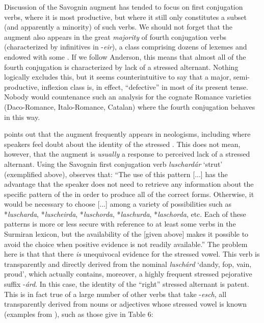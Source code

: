 \documentclass[output=paper,
modfonts
]{LSP/langsci}
\begin{document}
Discussion of the Savognin augment has tended to focus on first
conjugation verbs, where it is most productive, but where it still only
constitutes a subset (and apparently a minority) of such verbs. We
should not forget that the augment also appears in the great
\emph{majority} of fourth conjugation verbs (characterized by
infinitives in -\emph{eir}), a class comprising dozens of lexemes and
endowed with some . If we follow Anderson, this means that
almost all of the fourth conjugation is characterized by lack of a
stressed alternant. Nothing logically excludes this, but it seems
counterintuitive to say that a major, semi-productive, inflexion class
is, in effect, ``defective'' in most of its present tense. Nobody would
countenance such an analysis for the cognate Romance varieties
(Daco-Romance, Italo-Romance, Catalan) where the fourth conjugation
behaves in this way.

\citet[22]{anderson2011a} points out that the augment frequently appears in
neologisms, including where speakers feel doubt about the identity of
the stressed . This does not mean, however, that the augment is
\emph{usually} a response to perceived lack of a stressed alternant.
Using the Savognin first conjugation verb \emph{luschardár} `strut'
(exemplified above), \citet[122]{anderson2008a} observes that: ``The use of this
pattern {[}...{]} has the advantage that the speaker does not need to
retrieve any information about the specific  pattern of the
 in order to produce all of the correct forms. Otherwise, it would
be necessary to choose {[}...{]} among a variety of possibilities such
as *\emph{luscharda}, *\emph{luscheirda}, *\emph{luschorda},
*\emph{laschurda}, *\emph{laschorda}, etc. Each of these patterns is
more or less secure with reference to at least some verbs in the
Surmiran lexicon, but the availability of the  {[}given above{]}
makes it possible to avoid the choice when positive evidence is not
readily available.'' The problem here is that that there \emph{is}
unequivocal evidence for the stressed vowel. This verb is transparently
and directly derived from the nominal \emph{luschárd} `dandy, fop, vain,
proud', which actually contains, moreover, a highly frequent stressed
pejorative suffix -\emph{árd}. In this case, the identity of the ``right''
stressed alternant is patent. This is in fact true of a large number of
other verbs that take -\emph{esch}, all transparently derived from nouns
or adjectives whose stressed vowel is known (examples from \citealt{signorell2001a}), such as those give in Table 6:
\end{document}
